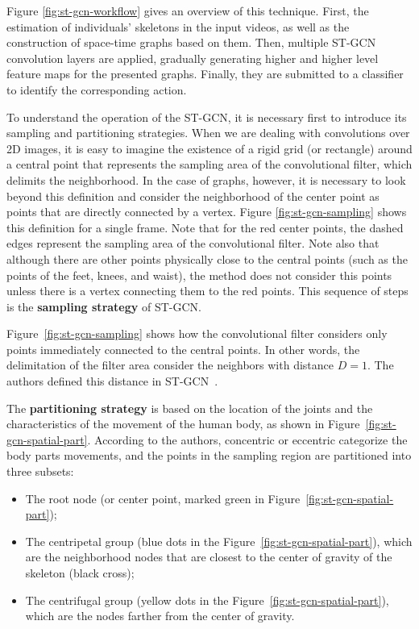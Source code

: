 Figure \ref{fig:st-gcn-workflow} gives an overview of this technique. First, the estimation of individuals' skeletons in the input videos, as well as the construction of space-time graphs based on them. Then, multiple ST-GCN convolution layers are applied, gradually generating higher and higher level feature maps for the presented graphs. Finally, they are submitted to a classifier to identify the corresponding action.

To understand the operation of the ST-GCN, it is necessary first to introduce its sampling and partitioning strategies. When we are dealing with convolutions over 2D images, it is easy to imagine the existence of a rigid grid (or rectangle) around a central point that represents the sampling area of the convolutional filter, which delimits the neighborhood. In the case of graphs, however, it is necessary to look beyond this definition and consider the neighborhood of the center point as points that are directly connected by a vertex. Figure \ref{fig:st-gcn-sampling} shows this definition for a single frame. Note that for the red center points, the dashed edges represent the sampling area of the convolutional filter. Note also that although there are other points physically close to the central points (such as the points of the feet, knees, and waist), the method does not consider this points unless there is a vertex connecting them to the red points. This sequence of steps is the \textbf{sampling strategy} of ST-GCN.


Figure~\ref{fig:st-gcn-sampling} shows how the convolutional filter considers only points immediately connected to the central points. In other words, the delimitation of the filter area consider the neighbors with distance $D = 1$. The authors defined this distance in ST-GCN~\cite{st-gcn-2018}.

The \textbf{partitioning strategy} is based on the location of the joints and the characteristics of the movement of the human body, as shown in Figure~\ref{fig:st-gcn-spatial-part}. According to the authors, concentric or eccentric categorize the body parts movements, and the points in the sampling region are partitioned into three subsets:
    
\begin{itemize}
    \item The root node (or center point, marked green in Figure~\ref{fig:st-gcn-spatial-part});
    \item The centripetal group (blue dots in the Figure~\ref{fig:st-gcn-spatial-part}), which are the neighborhood nodes that are closest to the center of gravity of the skeleton (black cross);
    \item The centrifugal group (yellow dots in the Figure~\ref{fig:st-gcn-spatial-part}), which are the nodes farther from the center of gravity.
\end{itemize}

